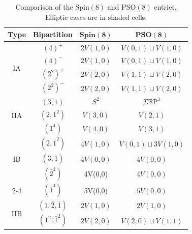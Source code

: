 \documentclass[11pt,a4paper]{article}
\renewcommand\arraystretch{1.15}
\def\Spin{\mathrm{Spin}}
\def\PSO{\mathrm{PSO}}
\def\R{\mathbb{R}}
\def\RP{\R\mathrm{P}}
\begin{document}
\begin{table}[h]
\centering
\renewcommand{\arraystretch}{1.35}
\setlength{\tabcolsep}{6pt}

\begin{tabular}{|c|c|c|c|}
\hline
\textbf{Type} &
\textbf{Bipartition} &
$\mathbf{Spin(8)}$ &
$\mathbf{PSO(8)}$ \\
\hline

\multirow{4}{*}{IA}
&
$(4)^{+}$
&
2$V(1,0)$
&
$V(0,1)\sqcup V(1,0)$
\\
\cline{2-4}

&
$(4)^{-}$
&
2$V(1,0)$
&
$V(0,1)\sqcup V(1,0)$
\\
\cline{2-4}

&
$(2^2)^{+}$
&
2$V(2,0)$
&
$V(1,1)\sqcup V(2,0)$
\\
\cline{2-4}

&
$(2^2)^{-}$
&
2$V(2,0)$
&
$V(1,1)\sqcup V(2,0)$
\\
\hline

\multirow{3}{*}{IIA}
&
$(3,1)$
&
$S^2$
&
$\Sigma \RP ^1$
\\
\cline{2-4}

&
$(2,1^2)$
&
$V(3,0)$
&
$V(2,1)$
\\
\cline{2-4}

&
$(1^4)$
&
$V(4,0)$
&
$V(3,1)$
\\
\hline

\multirow{3}{*}{IB}&
$(2, \bar{1}^2)$&$4V(1,0)$&$V(0,1)\sqcup 3V(1,0)$
\\
\cline{2-4}
&\cellcolor[gray]{0.9}$(\bar{3},\bar{1})$&\cellcolor[gray]{0.9}$4V(0,0)$&\cellcolor[gray]{0.9}$4V(0,0)$
\\
\cline{2-4}
&\cellcolor[gray]{0.9}$(\bar{2}^2)$&\cellcolor[gray]{0.9}4V(0,0)&\cellcolor[gray]{0.9}$4V(0,0)$
\\
\cline{2-4}
&\cellcolor[gray]{0.9}$(\bar{1}^4)$&\cellcolor[gray]{0.9}5V(0,0)&\cellcolor[gray]{0.9}$5V(0,0)$
\\
\hline

\multirow{2}{*}{IIB}
&
$(1, \bar{2},\bar{1})$
&
$2V(1,0)$
&
$2V(1,0)$
\\
\cline{2-4}

&
$(1^2, \bar{1}^2)$
&
$2V(2,0)$
&
$V(2,0)\sqcup V(1,1)$
\\
\hline

\end{tabular}

\bigskip

\caption{\label{Spin(8), PSO(8)}Comparison of the $\Spin(8)$ and $\PSO(8)$ entries. Elliptic cases are in shaded cells.}
\end{table}
\end{document}
